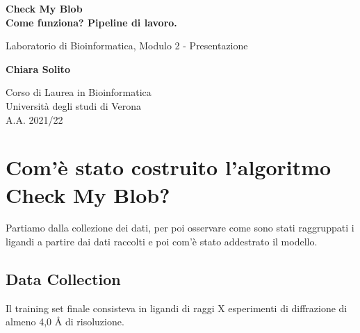 \documentclass{article}
\begin{document}
\newcommand\tab[1][0.3cm]{\hspace*{#1}}


\begin{titlepage}
    \begin{center}
        \vspace*{1cm}
            
        \Huge
        \textbf{Check My Blob}\\
        \LARGE
        \textbf{Come funziona? Pipeline di lavoro.}
            
        \vspace{0.5cm}
        \LARGE
        Laboratorio di Bioinformatica, Modulo 2 - Presentazione
            
        \vspace{1.5cm}
            
        \textbf{Chiara Solito}

        \vspace{0.8cm}

            
        \Large
        Corso di Laurea in Bioinformatica\\
        Università degli studi di Verona\\
        A.A. 2021/22
            
    \end{center}
\end{titlepage}

\newpage
\thispagestyle{empty}
\section{Com'è stato costruito l'algoritmo Check My Blob?}
Partiamo dalla collezione dei dati, per poi osservare come sono stati raggruppati i ligandi a partire dai dati raccolti e poi com'è stato addestrato il modello.
\subsection{Data Collection}
Il training set finale consisteva in ligandi di raggi X esperimenti di diffrazione di almeno 4,0 Å di risoluzione.
\end{document}
